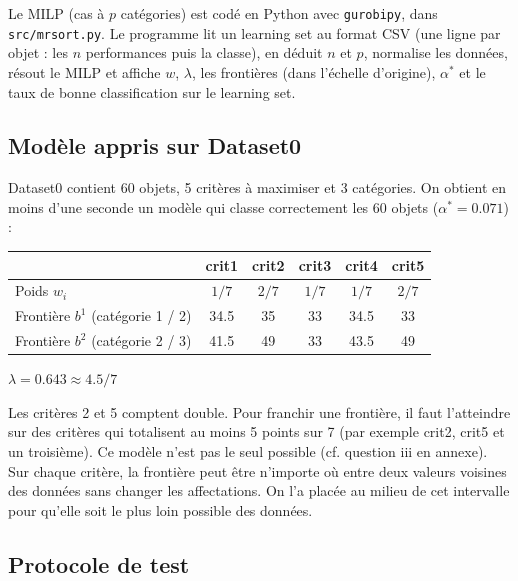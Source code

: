 \documentclass[10pt,a4paper]{article}
\begin{document}
Le MILP (cas à $p$ catégories) est codé en Python avec \texttt{gurobipy}, dans \texttt{src/mrsort.py}.
Le programme lit un learning set au format CSV (une ligne par objet : les $n$ performances puis la classe), en déduit
$n$ et $p$, normalise les données, résout le MILP et affiche $w$, $\lambda$, les frontières (dans l'échelle d'origine),
$\alpha^*$ et le taux de bonne classification sur le learning set.

\subsection*{Modèle appris sur Dataset0}

Dataset0 contient 60 objets, 5 critères à maximiser et 3 catégories. On obtient en moins d'une seconde un modèle
qui classe correctement les 60 objets ($\alpha^*=0.071$) :

\begin{center}
\begin{tabular}{lccccc}
\toprule
 & crit1 & crit2 & crit3 & crit4 & crit5 \\
\midrule
Poids $w_i$ & $1/7$ & $2/7$ & $1/7$ & $1/7$ & $2/7$ \\
Frontière $b^1$ (catégorie 1 / 2) & 34.5 & 35 & 33 & 34.5 & 33 \\
Frontière $b^2$ (catégorie 2 / 3) & 41.5 & 49 & 33 & 43.5 & 49 \\
\bottomrule
\end{tabular}
\qquad $\lambda = 0.643 \approx 4.5/7$
\end{center}

Les critères 2 et 5 comptent double. Pour franchir une frontière, il faut l'atteindre sur des critères qui totalisent
au moins 5 points sur 7 (par exemple crit2, crit5 et un troisième). Ce modèle n'est pas le seul possible (cf. question iii en annexe).
Sur chaque critère, la frontière peut être n'importe où entre deux valeurs voisines des données sans changer les affectations.
On l'a placée au milieu de cet intervalle pour qu'elle soit le plus loin possible des données.

\subsection*{Protocole de test}
\end{document}
